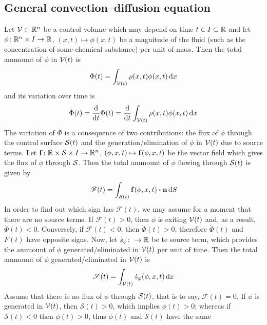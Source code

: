 
\subsection{General convection--diffusion equation}

Let $\mathcal{V}_{} \subset \mathbb{R}^n$ be a control volume which may depend on time $t \in I \subset \mathbb{R}$ and let
$\phi \colon \mathbb{R}^n \times I \to \mathbb{R}$, $(x, t) \mapsto \phi(x, t)$
be a magnitude of the fluid (such as the concentration of some chemical
substance) per unit of mass. Then the total ammount of $\phi$ in ${\mathcal{V}(t)}$ is
\begin{equation}
	\Phi(t) = 
	\int_{{\mathcal{V}(t)}} \rho(x, t) \phi(x, t) \dd{x}
\end{equation}
and its variation over time is
\begin{equation} \label{eq:general_cde_variation_Phi}
	\dot{\Phi}(t) =
	\frac{\dd}{\dd t} \Phi(t) = 
	\frac{\dd}{\dd{t}} \int_{{\mathcal{V}(t)}} \rho(x, t) \phi(x, t) \dd{x}
\end{equation}
The variation of $\Phi$ is a consequence of two contributions: the flux of
$\phi$ through the control surface ${\mathcal{S}(t)}$ and the generation/elimination of
$\phi$ in ${\mathcal{V}(t)}$ due to source terms. Let $\vb{f} \colon \mathbb{R} \times \mathcal{S}_{}
\times I \rightarrow \mathbb{R}^n$, $(\phi, x, t) \mapsto \vb{f}(\phi, x,
t)$ be the vector field which gives the flux of $\phi$ through $\mathcal{S}_{}$. Then the
total ammount of $\phi$ flowing through ${\mathcal{S}(t)}$ is given by
\begin{equation}
	\mathscr{F}(t) = \int_{\cst} \vb{f}(\phi, x, t) \vdot \vb{n} \dd{S}
\end{equation}
In order to find out which sign has $\mathscr{F}(t)$, we may assume for a moment
that there are no source terms. If $\mathscr{F}(t) > 0$, then $\phi$ is exiting
${\mathcal{V}(t)}$ and, as a result, $\dot{\Phi}(t) < 0$. Conversely, if $\mathscr{F}(t) <
0$, then $\dot{\Phi}(t) > 0$, therefore $\dot{\Phi}(t)$ and $F(t)$ have opposite
signs. Now, let $\dot{s}_\phi \colon \rightarrow \mathbb{R}$ be te source term, which
provides the ammount of $\phi$ generated/eliminated in ${\mathcal{V}(t)}$ per unit of time.
Then the total ammount of $\phi$ generated/eliminated in ${\mathcal{V}(t)}$ is
\begin{equation}
	\mathscr{S}(t) = \int_{{\mathcal{V}(t)}} \dot{s}_\phi (\phi, x, t) \dd{x}
\end{equation}
Assume that there is no flux of $\phi$ through ${\mathcal{S}(t)}$, that is to say,
$\mathscr{F}(t) = 0$. If $\phi$ is generated in ${\mathcal{V}(t)}$, then $\mathscr{S}(t) >
0$, which implies $\dot{\phi}(t) > 0$; whereas if $\mathscr{S}(t) < 0$ then
$\dot{\phi}(t) > 0$, thus $\dot{\phi}(t)$ and $\mathscr{S}(t)$ have the same

